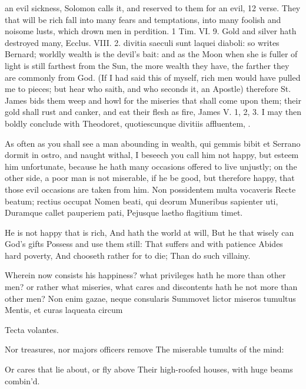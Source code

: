 {an evil sickness, Solomon calls it, and reserved to them for an evil,
12 verse. They that will be rich fall into many fears and temptations,
into many foolish and noisome lusts, which drown men in perdition. 1
Tim. VI. 9. Gold and silver hath destroyed many, Ecclus. VIII. 2.
divitia saeculi sunt laquei diaboli: so writes Bernard; worldly wealth
is the devil's bait: and as the Moon when she is fuller of light is
still farthest from the Sun, the more wealth they have, the farther
they are commonly from God. (If I had said this of myself, rich men
would have pulled me to pieces; but hear who saith, and who seconds it,
an Apostle) therefore St. James bids them weep and howl for the
miseries that shall come upon them; their gold shall rust and canker,
and eat their flesh as fire, James V. 1, 2, 3. I may then boldly
conclude with Theodoret, quotiescunque divitiis affluentem, \etc{}.

As often as you shall see a man abounding in wealth, qui gemmis bibit
et Serrano dormit in ostro, and naught withal, I beseech you call him
not happy, but esteem him unfortunate, because he hath many occasions
offered to live unjustly; on the other side, a poor man is not
miserable, if he be good, but therefore happy, that those evil
occasions are taken from him.
Non possidentem multa vocaveris
Recte beatum; rectius occupat
Nomen beati, qui deorum
Muneribus sapienter uti,
Duramque callet pauperiem pati,
Pejusque laetho flagitium timet.

He is not happy that is rich,
And hath the world at will,
But he that wisely can God's gifts
Possess and use them still:
That suffers and with patience
Abides hard poverty,
And chooseth rather for to die;
Than do such villainy.

Wherein now consists his happiness? what privileges hath he more than
other men? or rather what miseries, what cares and discontents hath he
not more than other men?
Non enim gazae, neque consularis
Summovet lictor miseros tumultus
Mentis, et curas laqueata circum

Tecta volantes.


Nor treasures, nor majors officers remove
The miserable tumults of the mind:

Or cares that lie about, or fly above
Their high-roofed houses, with huge beams combin'd.

}
